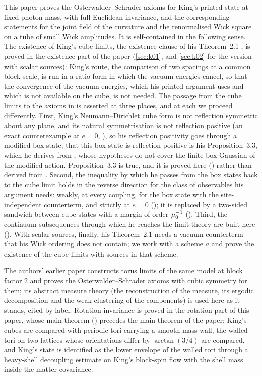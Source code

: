 This paper proves the Osterwalder--Schrader axioms for King's printed state at fixed photon mass, with
full Euclidean invariance, and the corresponding statements for the joint field of the curvature and the
renormalised Wick square on a tube of small Wick amplitudes. It is self-contained in the following sense.
The existence of King's cube limits, the existence clause of his Theorem~2.1 \cite{K2}, is proved in the
existence part of the paper (\cref{sec:k01}, and \cref{sec:k02} for the
version with scalar sources): King's route, the comparison of two spacings at a common block scale, is run
in a ratio form in which the vacuum energies cancel, so that the convergence of the vacuum energies, which
his printed argument uses and which is not available on the cube, is not needed. The passage from the cube
limits to the axioms in \cite{K2} is asserted at three places, and at each we proceed differently. First,
King's Neumann--Dirichlet cube form is not reflection symmetric about any plane, and its natural
symmetrisation is not reflection positive (an exact counterexample at $e=0$, ), so his
reflection positivity goes through a modified box state; that this box state is reflection positive is his
Proposition~3.3, which he derives from \cite[Cor.~5.4]{BFS1}, whose hypotheses do not cover the finite-box
Gaussian of the modified action. Proposition~3.3 is true, and it is proved here ()
rather than derived from \cite[Cor.~5.4]{BFS1}. Second, the inequality by which he passes from the box
states back to the cube limit holds in the reverse direction for the class of observables his argument
needs: weakly, at every coupling, for the box state with the site-independent counterterm, and strictly at
$e=0$ (); it is replaced by a two-sided sandwich between cube states with a margin of order
$\mu_0^{-1}$ (). Third, the continuum subsequences through which he reaches the
limit theory are built here (). With scalar sources, finally, his Theorem~2.1 needs a
vacuum counterterm that his Wick ordering does not contain; we work with a scheme $a$ and prove the
existence of the cube limits with sources in that scheme.

The authors' earlier paper \cite{SymPhase} constructs torus limits of the same model at block factor $2$
and proves the Osterwalder--Schrader axioms with cubic symmetry for them; its abstract measure theory (the
reconstruction of the measure, its ergodic decomposition and the weak clustering of the components) is used
here as it stands, cited by label. Rotation invariance is proved in the rotation part of this paper, whose
main theorem () precedes the main theorem of the paper: King's cubes are compared with periodic tori carrying
a smooth mass wall, the walled tori on two lattices whose orientations differ by $\arctan(3/4)$ are
compared, and King's state is identified as the lower envelope of the walled tori through a heavy-shell
decoupling estimate on King's block-spin flow with the shell mass inside the matter covariance.

